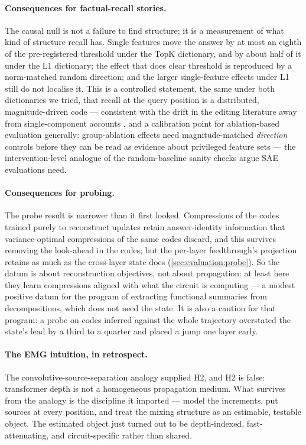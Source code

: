 \paragraph{Consequences for factual-recall stories.}
The causal null is not a failure to find structure; it is a measurement of
what kind of structure recall has. Single features move the answer by at most
an eighth of the pre-registered threshold under the TopK dictionary, and by
about half of it under the L1 dictionary; the effect that does clear
threshold
is reproduced by a norm-matched random direction; and the larger
single-feature effects under L1 still do not localise it. This is a
controlled statement, the same under both dictionaries we tried, that recall
at the query position is a
distributed, magnitude-driven code --- consistent with the drift in the
editing literature away from single-component accounts
\citep{hase2023does}, and a calibration point for ablation-based evaluation
generally: group-ablation effects need magnitude-matched \emph{direction}
controls before they can be read as evidence about privileged feature sets
--- the intervention-level analogue of the random-baseline sanity checks
\citet{korznikov2026sanity} argue SAE evaluations need.

\paragraph{Consequences for probing.}
The probe result is narrower than it first looked. Compressions of the codes
trained purely to reconstruct updates retain answer-identity information that
variance-optimal compressions of the same codes discard, and this survives
removing the look-ahead in the codes; but the per-layer feedthrough's
projection retains as much as the cross-layer state does
(\cref{sec:evaluation:probe}). So the datum is about reconstruction
objectives, not about propagation: at least here they learn compressions
aligned with what the circuit is computing --- a modest positive datum for
the program of extracting functional summaries from decompositions, which
does not need the state. It is also a caution for that program: a probe on
codes inferred against the whole trajectory overstated the state's lead by a
third to a quarter and placed a jump one layer early.

\paragraph{The EMG intuition, in retrospect.}
The convolutive-source-separation analogy \citep{holobar2007multichannel}
supplied H2, and H2 is false: transformer depth is not a homogeneous
propagation medium. What survives from the analogy is the discipline it
imported --- model the increments, put sources at every position, and treat
the mixing structure as an estimable, testable object. The estimated object
just turned out to be depth-indexed, fast-attenuating, and circuit-specific
rather than shared.

